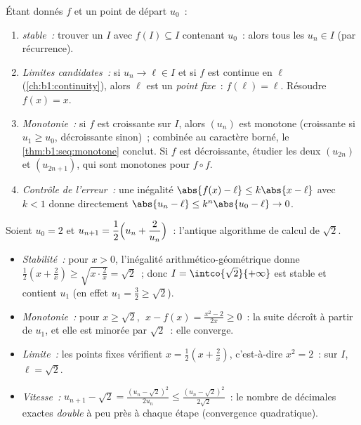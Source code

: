 \begin{method}[Étudier $u_{n+1} = f(u_n)$]\label{met:b1:seq:recurrent}
Étant donnés $f$ et un point de départ $u_0$~:
\begin{enumerate}
  \item \emph{ stable~:} trouver un  $I$ avec
        $f(I) \subseteq I$ contenant $u_0$~: alors tous les $u_n \in
        I$ (par récurrence).
  \item \emph{Limites candidates~:} si $u_n \to \ell \in I$ et si $f$
        est continue en $\ell$ (\cref{ch:b1:continuity}), alors $\ell$
        est un \emph{point fixe}~: $f(\ell) = \ell$. Résoudre $f(x) =
        x$.
  \item \emph{Monotonie~:} si $f$ est croissante sur $I$, alors
        $(u_n)$ est monotone (croissante si $u_1 \geq u_0$,
        décroissante sinon)~; combinée au caractère borné, le
        \cref{thm:b1:seq:monotone} conclut. Si $f$ est décroissante,
        étudier les deux  $(u_{2n})$ et $(u_{2n+1})$,
        qui sont monotones pour $f \circ f$.
  \item \emph{Contrôle de l'erreur~:} une inégalité $\abs{f(x) - \ell}
        \leq k\abs{x - \ell}$ avec $k < 1$ donne directement
        $\abs{u_n - \ell} \leq k^n \abs{u_0 - \ell} \to 0$.
\end{enumerate}
\end{method}

\begin{example}\label{ex:b1:seq:heron}
Soient $u_0 = 2$ et $u_{n+1} = \dfrac12\Bigl(u_n +
\dfrac{2}{u_n}\Bigr)$~: l'antique algorithme de calcul de
$\sqrt 2$.
\begin{itemize}
  \item \emph{Stabilité~:} pour $x > 0$, l'inégalité
        arithmético-géométrique donne $\frac12(x + \frac2x) \geq
        \sqrt{x \cdot \frac 2x} = \sqrt 2$~; donc $I =
        \intco{\sqrt 2}{+\infty}$ est stable et contient $u_1$ (en
        effet $u_1 = \frac32 \geq \sqrt 2$).
  \item \emph{Monotonie~:} pour $x \geq \sqrt 2$, $\;x - f(x) =
        \frac{x^2 - 2}{2x} \geq 0$~: la suite décroît à partir de
        $u_1$, et elle est minorée par $\sqrt 2$~: elle converge.
  \item \emph{Limite~:} les points fixes vérifient $x = \frac12(x +
        \frac2x)$, c'est-à-dire $x^2 = 2$~: sur $I$, $\ell = \sqrt 2$.
  \item \emph{Vitesse~:} $u_{n+1} - \sqrt 2 = \frac{(u_n -
        \sqrt2)^2}{2u_n} \leq \frac{(u_n - \sqrt 2)^2}{2\sqrt 2}$~:
        le nombre de décimales exactes \emph{double} à peu près à
        chaque étape (convergence quadratique).
\end{itemize}
\end{example}

